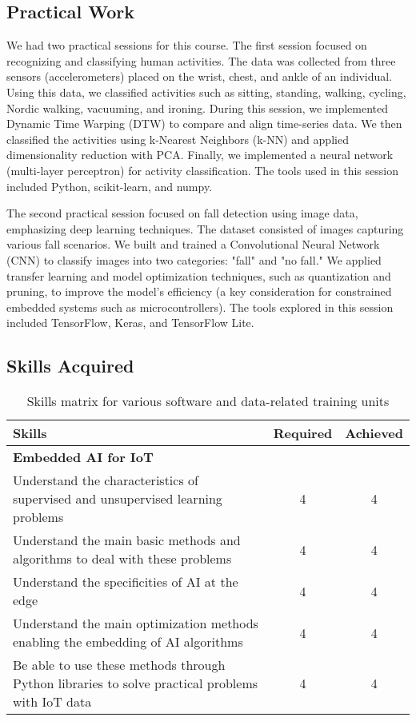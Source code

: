 \subsection{Practical Work}
\indent \indent We had two practical sessions for this course. The first session focused on recognizing and classifying human activities. 
The data was collected from three sensors (accelerometers) placed on the wrist, chest, and ankle of an individual. 
Using this data, we classified activities such as sitting, standing, walking, cycling, Nordic walking, vacuuming, and ironing.
During this session, we implemented Dynamic Time Warping (DTW) to compare and align time-series data. 
We then classified the activities using k-Nearest Neighbors (k-NN) and applied dimensionality reduction with PCA. 
Finally, we implemented a neural network (multi-layer perceptron) for activity classification. 
The tools used in this session included Python, scikit-learn, and numpy.
\vspace{0.25cm}

\noindent The second practical session focused on fall detection using image data, emphasizing deep learning techniques. 
The dataset consisted of images capturing various fall scenarios. 
We built and trained a Convolutional Neural Network (CNN) to classify images into two categories: "fall" and "no fall." 
We applied transfer learning and model optimization techniques, such as quantization and pruning, to improve the model's efficiency (a key consideration for constrained embedded systems such as microcontrollers). 
The tools explored in this session included TensorFlow, Keras, and TensorFlow Lite.

\subsection{Skills Acquired}
\begin{table}[H]
    \centering
    \renewcommand{\arraystretch}{1.5}
    \begin{tabular}{|p{11cm}|c|c|}
    \hline
    \rowcolor[gray]{0.8}
    \textbf{Skills} & \textbf{Required} & \textbf{Achieved} \\ \hline
    \rowcolor[gray]{0.9} \textbf{Embedded AI for IoT} &  &  \\ \hline
    Understand the characteristics of supervised and unsupervised learning problems & 4 & 4 \\ \hline
    Understand the main basic methods and algorithms to deal with these problems & 4 & 4 \\ \hline
    Understand the specificities of AI at the edge & 4 & 4 \\ \hline
    Understand the main optimization methods enabling the embedding of AI algorithms & 4 & 4 \\ \hline
    Be able to use these methods through Python libraries to solve practical problems with IoT data & 4 & 4 \\ \hline
    \end{tabular}
    \caption{Skills matrix for various software and data-related training units}
    \label{table:skills-embedded-ia}
\end{table}

